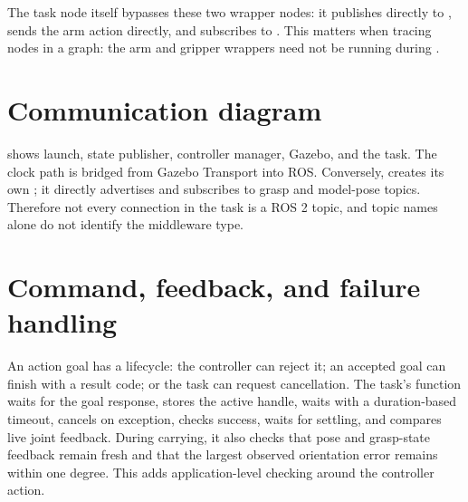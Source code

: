 The task node itself bypasses these two wrapper nodes: it publishes directly
to , sends the arm action directly, and
subscribes to . This matters when tracing nodes in a graph:
the arm and gripper wrappers need not be running during .

\section{Communication diagram}
 shows launch, state publisher, controller manager,
Gazebo, and the task. The clock path is bridged from Gazebo Transport into
ROS. Conversely,  creates its own
; it directly advertises and subscribes to grasp
and model-pose topics. Therefore not every connection in the task is a ROS 2
topic, and topic names alone do not identify the middleware type.

\section{Command, feedback, and failure handling}
An action goal has a lifecycle: the controller can reject it; an accepted
goal can finish with a result code; or the task can request cancellation. The
task's  function waits for the goal response, stores the active
handle, waits with a duration-based timeout, cancels on exception, checks
success, waits for settling, and compares live joint feedback. During carrying,
it also checks that pose and grasp-state feedback remain fresh and that the
largest observed orientation error remains within one degree. This adds
application-level checking around the controller action.
